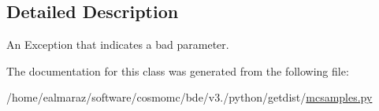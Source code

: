 \subsection{Detailed Description}
\begin{DoxyVerb}An Exception that indicates a bad parameter.
\end{DoxyVerb}
 

The documentation for this class was generated from the following file\+:\begin{DoxyCompactItemize}
\item 
/home/ealmaraz/software/cosmomc/bde/v3./python/getdist/\mbox{\hyperlink{mcsamples_8py}{mcsamples.\+py}}\end{DoxyCompactItemize}
